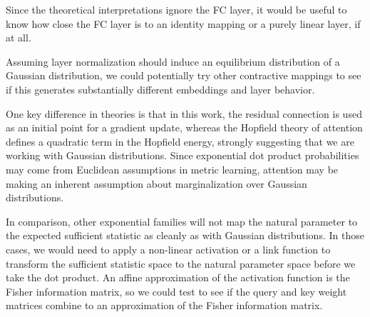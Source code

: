 \documentclass{article}
\begin{document}
Since the theoretical interpretations ignore the FC layer, it would be useful to know how close the FC layer is to an identity mapping or a purely linear layer, if at all.


Assuming layer normalization should induce an equilibrium distribution of a Gaussian distribution, we could potentially try other contractive mappings to see if this generates substantially different embeddings and layer behavior.

One key difference in theories is that in this work, the residual connection is used as an initial point for a gradient update, whereas the Hopfield theory of attention defines a quadratic term in the Hopfield energy, strongly suggesting that we are working with Gaussian distributions. Since exponential dot product probabilities may come from Euclidean assumptions in metric learning, attention may be making an inherent assumption about marginalization over Gaussian distributions.

In comparison, other exponential families will not map the natural parameter to the expected sufficient statistic as cleanly as with Gaussian distributions. In those cases, we would need to apply a non-linear activation or a link function to transform the sufficient statistic space to the natural parameter space before we take the dot product. An affine approximation of the activation function is the Fisher information matrix, so we could test to see if the query and key weight matrices combine to an approximation of the Fisher information matrix.




\end{document}
